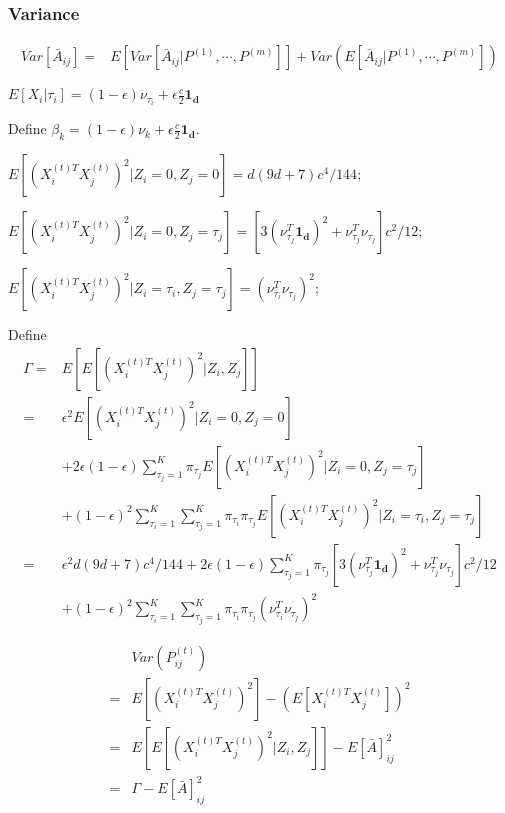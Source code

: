 \documentclass[a4paper]{article}
\begin{document}
\subsubsection{Variance}
\begin{align*}
	Var \left[ \bar{A}_{ij} \right] = & E \left[ Var \left[ \bar{A}_{ij} | P^{(1)}, \cdots, P^{(m)} \right] \right] + Var \left( E \left[ \bar{A}_{ij} | P^{(1)}, \cdots, P^{(m)} \right] \right)
\end{align*}

$E\left[ X_i |\tau_i \right] = (1-\epsilon) \nu_{\tau_i} + \epsilon \frac{c}{2} \boldsymbol{1_d}$

Define $\beta_k = (1-\epsilon) \nu_k + \epsilon \frac{c}{2} \boldsymbol{1_d}$.

$E\left[ \left( X_i^{(t)T} X_j^{(t)} \right)^2 | Z_i=0, Z_j=0 \right] = d(9d+7)c^4/144$;

$E\left[ \left( X_i^{(t)T} X_j^{(t)} \right)^2 | Z_i=0, Z_j=\tau_j \right] =
\left[ 3 \left( \nu_{\tau_j}^T \boldsymbol{1_d} \right)^2 + \nu_{\tau_j}^T \nu_{\tau_j} \right] c^2/12$;

$E\left[ \left( X_i^{(t)T} X_j^{(t)} \right)^2 | Z_i=\tau_i, Z_j=\tau_j \right] =
\left( \nu_{\tau_i}^T \nu_{\tau_j} \right)^2 $;

Define
\begin{align*}
	\Gamma = & E \left[ E\left[ \left( X_i^{(t)T} X_j^{(t)} \right)^2 | Z_i, Z_j \right]\right] \\
    = & \epsilon^2 E\left[ \left( X_i^{(t)T} X_j^{(t)} \right)^2 | Z_i=0, Z_j=0 \right] \\
    & + 2 \epsilon (1-\epsilon) \sum_{\tau_j = 1}^K \pi_{\tau_j} E\left[ \left( X_i^{(t)T} X_j^{(t)} \right)^2 | Z_i=0, Z_j=\tau_j \right] \\
    & + (1-\epsilon)^2 \sum_{\tau_i=1}^K \sum_{\tau_j=1}^K \pi_{\tau_i} \pi_{\tau_j} E\left[ \left( X_i^{(t)T} X_j^{(t)} \right)^2 | Z_i=\tau_i, Z_j=\tau_j \right] \\
    = & \epsilon^2 d(9d+7)c^4/144
    + 2 \epsilon (1-\epsilon) \sum_{\tau_j = 1}^K \pi_{\tau_j} \left[ 3 \left( \nu_{\tau_j}^T \boldsymbol{1_d} \right)^2 + \nu_{\tau_j}^T \nu_{\tau_j} \right] c^2/12 \\
    & + (1-\epsilon)^2 \sum_{\tau_i=1}^K \sum_{\tau_j=1}^K \pi_{\tau_i} \pi_{\tau_j} \left( \nu_{\tau_i}^T \nu_{\tau_j} \right)^2
\end{align*}

\begin{align*}
	& Var \left( P_{ij}^{(t)} \right) \\
    = & E \left[ \left( X_i^{(t)T} X_j^{(t)} \right)^2 \right]
      - \left( E \left[ X_i^{(t)T} X_j^{(t)} \right]\right)^2 \\
    = & E \left[ E\left[ \left( X_i^{(t)T} X_j^{(t)} \right)^2 | Z_i, Z_j \right]\right] - E[\bar{A}]_{ij}^2 \\
    = & \Gamma - E[\bar{A}]_{ij}^2
\end{align*}
\end{document}
